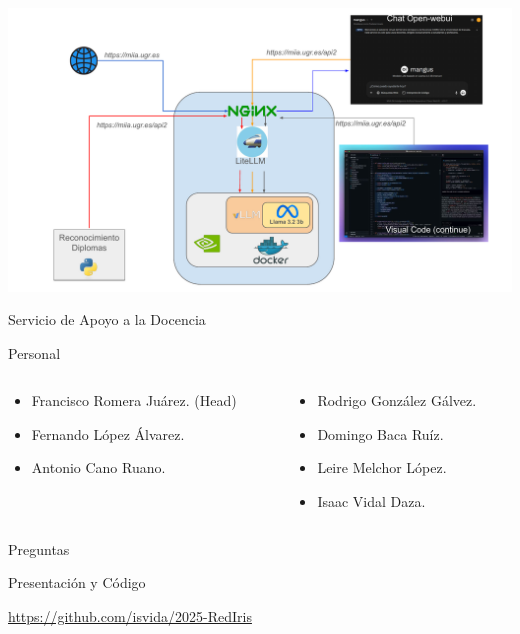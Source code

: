 \documentclass[aspectratio=169]{beamer}
\begin{document}
\begin{frame}
        \begin{center}
            \includegraphics[width=14cm]{imagenes/MiIA_completo.pdf}
        \end{center}
\end{frame}


\begin{frame}{Servicio de Apoyo a la Docencia}
    \begin{block}{\centering Personal}
        \begin{columns}
            \begin{column}{0.5\linewidth}

                \begin{itemize}
                    \item Francisco Romera Juárez. (Head)
                    \item Fernando López Álvarez.
                    \item Antonio Cano Ruano.
                \end{itemize}

            \end{column}
            \begin{column}{0.5\linewidth}
                \begin{itemize}
                    \item Rodrigo González Gálvez.
                    \item Domingo Baca Ruíz.
                    \item Leire Melchor López.
                    \item Isaac Vidal Daza.
                \end{itemize}
            \end{column}
        \end{columns}
    \end{block}
\end{frame}


\begin{frame}{Preguntas}
    \begin{block}{Presentación y Código}
    \begin{center}
        \href{https://github.com/isvida/2025-RedIris}{https://github.com/isvida/2025-RedIris}
    \end{center}
\end{block}
\end{frame}
\end{document}
